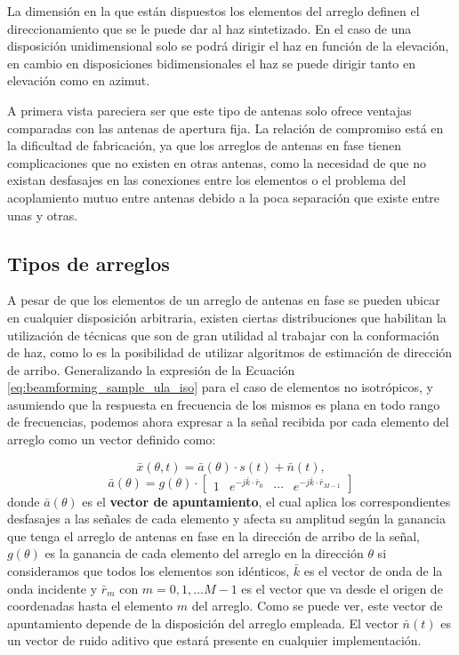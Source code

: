 La dimensión en la que están dispuestos los elementos del arreglo definen el direccionamiento que se le puede dar al haz sintetizado. En el caso de una disposición unidimensional solo se podrá dirigir el haz en función de la elevación, en cambio en disposiciones bidimensionales el haz se puede dirigir tanto en elevación como en azimut.

A primera vista pareciera ser que este tipo de antenas solo ofrece ventajas comparadas con las antenas de apertura fija. La relación de compromiso está en la dificultad de fabricación, ya que los arreglos de antenas en fase tienen complicaciones que no existen en otras antenas, como la necesidad de que no existan desfasajes en las conexiones entre los elementos o el problema del acoplamiento mutuo entre antenas debido a la poca separación que existe entre unas y otras.

\subsection{Tipos de arreglos}\label{subc:beamforming_phasedarraystipos}

A pesar de que los elementos de un arreglo de antenas en fase se pueden ubicar en cualquier disposición arbitraria, existen ciertas distribuciones que habilitan la utilización de técnicas que son de gran utilidad al trabajar con la conformación de haz, como lo es la posibilidad de utilizar algoritmos de estimación de dirección de arribo. Generalizando la expresión de la Ecuación \ref{eq:beamforming_sample_ula_iso} para el caso de elementos no isotrópicos, y asumiendo que la respuesta en frecuencia de los mismos es plana en todo rango de frecuencias, podemos ahora expresar a la señal recibida por cada elemento del arreglo como un vector definido como:

\begin{equation}
    \bar{x} (\theta,t)  =\bar{a}(\theta)\cdot s(t) + \bar{n}(t),
\end{equation}
\begin{equation}
    \bar{a}(\theta)     = g(\theta)\cdot \begin{bmatrix}
        1 & e^{-j\bar{k}\cdot \bar{r}_0} & \cdots & e^{-j\bar{k}\cdot \bar{r}_{M-1}}
    \end{bmatrix}
    \label{eq:beamforming_stearingvector}
\end{equation}
donde $\bar{a}(\theta)$ es el \textbf{vector de apuntamiento}, el cual aplica los correspondientes desfasajes a las señales de cada elemento y afecta su amplitud según la ganancia que tenga el arreglo de antenas en fase en la dirección de arribo de la señal, $g(\theta)$ es la ganancia de cada elemento del arreglo en la dirección $\theta$ si consideramos que todos los elementos son idénticos, $\bar{k}$ es el vector de onda de la onda incidente y $\bar{r}_m$ con $m=0,1,...M-1$ es el vector que va desde el origen de coordenadas hasta el elemento $m$ del arreglo. Como se puede ver, este vector de apuntamiento depende de la disposición del arreglo empleada. El vector $\bar{n}(t)$ es un vector de ruido aditivo que estará presente en cualquier implementación.

